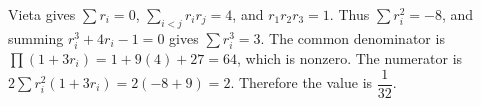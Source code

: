 Vieta gives $\sum r_i=0$, $\sum_{i<j}r_ir_j=4$, and $r_1r_2r_3=1$. Thus $\sum r_i^2=-8$, and summing $r_i^3+4r_i-1=0$ gives $\sum r_i^3=3$. The common denominator is $\prod(1+3r_i)=1+9(4)+27=64$, which is nonzero. The numerator is $2\sum r_i^2(1+3r_i)=2(-8+9)=2$. Therefore the value is $\boxed{\dfrac{1}{32}}$.
